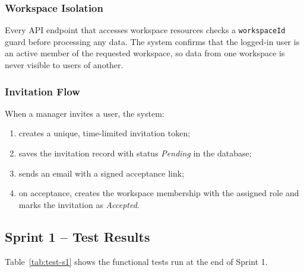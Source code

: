 \documentclass[12pt,a4paper]{report}
\begin{document}
\subsubsection{Workspace Isolation}

Every API endpoint that accesses workspace resources checks a
\texttt{workspaceId} guard before processing any data.
The system confirms that the logged-in user is an active member of the requested
workspace, so data from one workspace is never visible to users of another.

\subsubsection{Invitation Flow}

When a manager invites a user, the system:
\begin{enumerate}
  \item creates a unique, time-limited invitation token;
  \item saves the invitation record with status \textit{Pending} in the database;
  \item sends an email with a signed acceptance link;
  \item on acceptance, creates the workspace membership with the assigned role
        and marks the invitation as \textit{Accepted}.
\end{enumerate}

\subsection{Sprint 1 -- Test Results}

Table~\ref{tab:test-s1} shows the functional tests run at the end of Sprint 1.
\end{document}
